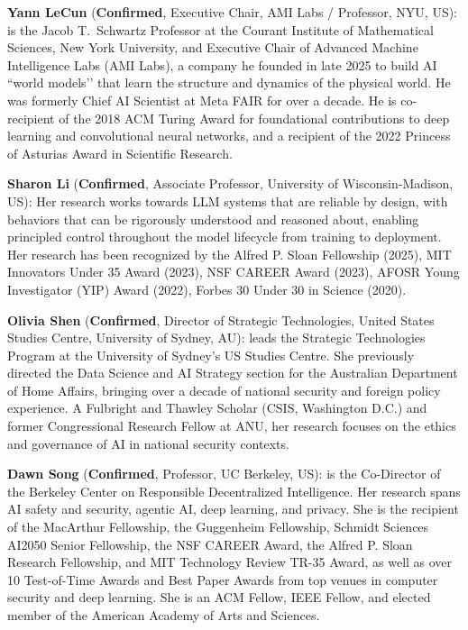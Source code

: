 \documentclass{article}
\newcommand{\confirmed}{\textcolor{green!60!black}{\textbf{Confirmed}}}
\begin{document}
\textbf{Yann LeCun} (\confirmed, Executive Chair, AMI Labs / Professor, NYU, US): is the Jacob T.~Schwartz Professor at the Courant Institute of Mathematical Sciences, New York University, and Executive Chair of Advanced Machine Intelligence Labs (AMI Labs), a company he founded in late 2025 to build AI ``world models’’ that learn the structure and dynamics of the physical world. He was formerly Chief AI Scientist at Meta FAIR for over a decade. He is co-recipient of the 2018 ACM Turing Award for foundational contributions to deep learning and convolutional neural networks, and a recipient of the 2022 Princess of Asturias Award in Scientific Research.
     
\textbf{Sharon Li} (\confirmed, Associate Professor, University of Wisconsin-Madison, US): Her research works towards LLM systems that are reliable by design, with behaviors that can be rigorously understood and reasoned about, enabling principled control throughout the model lifecycle from training to deployment. Her research has been recognized by the Alfred P. Sloan Fellowship (2025), MIT Innovators Under 35 Award (2023), NSF CAREER Award (2023), AFOSR Young Investigator (YIP) Award (2022), Forbes 30 Under 30 in Science (2020).

\textbf{Olivia Shen} (\confirmed, Director of Strategic Technologies, United States Studies Centre, University of Sydney, AU): leads the Strategic Technologies Program at the University of Sydney’s US Studies Centre. She previously directed the Data Science and AI Strategy section for the Australian Department of Home Affairs, bringing over a decade of national security and foreign policy experience. A Fulbright and Thawley Scholar (CSIS, Washington D.C.) and former Congressional Research Fellow at ANU, her research focuses on the ethics and governance of AI in national security contexts.

\textbf{Dawn Song} (\confirmed, Professor, UC Berkeley, US): is the Co-Director of the Berkeley Center on Responsible Decentralized Intelligence. Her research spans AI safety and security, agentic AI, deep learning, and privacy. She is the recipient of the MacArthur Fellowship, the Guggenheim Fellowship, Schmidt Sciences AI2050 Senior Fellowship, the NSF CAREER Award, the Alfred P. Sloan Research Fellowship, and MIT Technology Review TR-35 Award, as well as over 10 Test-of-Time Awards and Best Paper Awards from top venues in computer security and deep learning. She is an ACM Fellow, IEEE Fellow, and elected member of the American Academy of Arts and Sciences.
    
\end{document}
